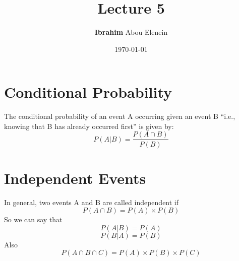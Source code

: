 \documentclass[12pt]{article}
\title{\textbf{Lecture 5}} %
\author{\textbf{Ibrahim} Abou Elenein}
\date{\today} %
\theoremstyle{definition}
\begin{document}
\setlength{\droptitle}{-5em}    
\maketitle
\tableofcontents
\pagebreak
\section{Conditional Probability}
The conditional probability of an event
A occurring given an event B “i.e.,
knowing that B has already occurred
first” is given by:
$$P(A|B) = \frac{P(A \cap B)}{P(B)}$$

\section{Independent Events}
In general, two events A and B are called independent if 
$$ P(A \cap B) = P(A) \times P(B)$$
So we can say that 
$$ P(A|B) = P(A) $$
$$ P(B|A) = P(B) $$
Also $$ P(A\cap B \cap C) = P(A)\times P(B) \times P(C)$$
\end{document}
